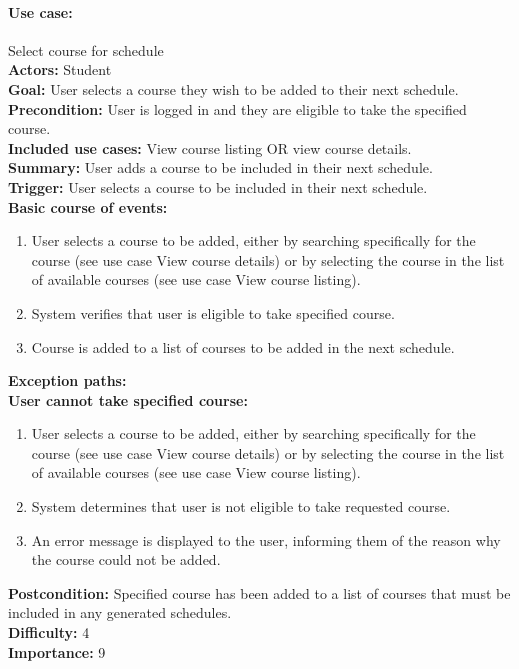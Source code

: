 \documentclass[12pt]{article}
\begin{document}
\paragraph*{Use case:} Select course for schedule\\
\textbf{Actors:} Student\\
\textbf{Goal:} User selects a course they wish to be added to their next schedule.\\
\textbf{Precondition:} User is logged in and they are eligible to take the specified course.\\
\textbf{Included use cases:} View course listing OR view course details.\\
\textbf{Summary:} User adds a course to be included in their next schedule.\\
\textbf{Trigger:} User selects a course to be included in their next schedule.\\
\textbf{Basic course of events:}
\begin{enumerate}
\item User selects a course to be added, either by searching specifically for the course
(see use case View course details) or by selecting the course in the list of available courses
(see use case View course listing).
\item System verifies that user is eligible to take specified course.
\item Course is added to a list of courses to be added in the next schedule.
\end{enumerate}
\textbf{Exception paths:}\\
\textbf{User cannot take specified course:}
\begin{enumerate}
\item User selects a course to be added, either by searching specifically for the course
(see use case View course details) or by selecting the course in the list of available courses
(see use case View course listing).
\item System determines that user is not eligible to take requested course.
\item An error message is displayed to the user, informing them of the reason why the course could not be added.
\end{enumerate}
\textbf{Postcondition:} Specified course has been added to a list of courses that must be included in any generated schedules.\\
\textbf{Difficulty:} 4\\
\textbf{Importance:} 9\\
\end{document}
